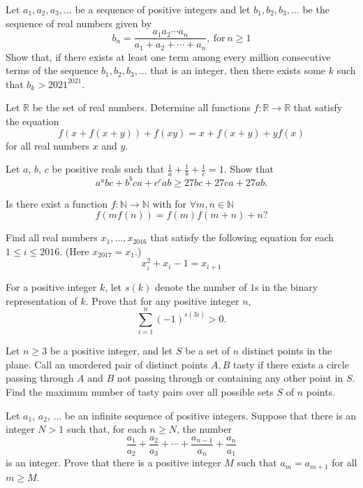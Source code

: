 \documentclass[11pt]{scrartcl}
\begin{document}
\begin{problem}[372825050751557]
Let $a_1,a_2,a_3, \ldots$ be a sequence of positive integers and let $b_1,b_2,b_3,\ldots$ be the sequence of real numbers given by
$$b_n = \dfrac{a_1a_2\cdots a_n}{a_1+a_2+\cdots + a_n},\ \mbox{for}\ n\geq 1$$Show that, if there exists at least one term among every million consecutive terms of the sequence $b_1,b_2,b_3,\ldots$ that is an integer, then there exists some $k$ such that $b_k > 2021^{2021}$.
\end{problem}
\begin{problem}[380257662603408]
	Let $\mathbb R$ be the set of real numbers. Determine all functions $f:\mathbb R\to\mathbb R$ that satisfy the equation\[f(x+f(x+y))+f(xy)=x+f(x+y)+yf(x)\]for all real numbers $x$ and $y$.
\end{problem}
\begin{problem}[395315144480173]
Let $a$, $b$, $c$ be positive reals such that $\frac{1}{a}+\frac{1}{b}+\frac{1}{c}=1$. Show that$$a^abc+b^bca+c^cab\ge 27bc+27ca+27ab.$$
\end{problem}
\begin{problem}[396278288072902]
Is there exist a function $f:\mathbb {N}\to \mathbb {N}$ with for $\forall m,n \in \mathbb {N}$$$f\left(mf\left(n\right)\right)=f\left(m\right)f\left(m+n\right)+n ?$$
\end{problem}
\begin{problem}[397912644922719]
Find all real numbers $x_1, \dots, x_{2016}$ that satisfy the following equation for each $1 \le i \le 2016$. (Here $x_{2017} = x_1$.)
\[ x_i^2 + x_i - 1 = x_{i+1} \]
\end{problem}
\begin{problem}[402139377468684]
For a positive integer $k$, let $s(k)$ denote the number of $1$s in the binary representation of $k$. Prove that for any positive integer $n$,
\[\sum_{i=1}^{n}(-1)^{s(3i)} > 0.\]
\end{problem}
\begin{problem}[402288800658108]
Let $n \ge 3$ be a positive integer, and let $S$ be a set of $n$ distinct points in the plane. Call an unordered pair of distinct points ${A,B}$ tasty if there exists a circle passing through $A$ and $B$ not passing through or containing any other point in $S$. Find the maximum number of tasty pairs over all possible sets $S$ of $n$ points.
\end{problem}
\begin{problem}[402654566950359]
Let $a_1$, $a_2$, $\ldots$ be an infinite sequence of positive integers. Suppose that there is an integer $N > 1$ such that, for each $n \geq N$, the number
$$\frac{a_1}{a_2} + \frac{a_2}{a_3} + \cdots + \frac{a_{n-1}}{a_n} + \frac{a_n}{a_1}$$is an integer. Prove that there is a positive integer $M$ such that $a_m = a_{m+1}$ for all $m \geq M$.
\end{problem}
\end{document}
